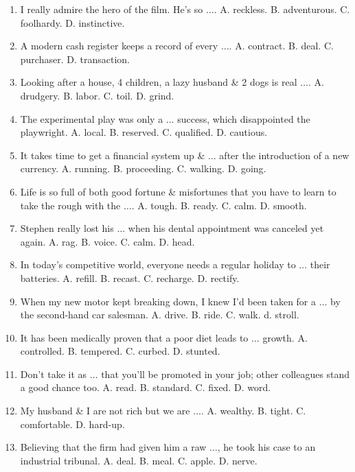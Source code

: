 \documentclass{article}
\numberwithin{equation}{section}
\begin{document}
\begin{enumerate}[leftmargin=8mm]
	\item I really admire the hero of the film. He's so $\ldots$. {\sf A.} reckless. {\sf B.} adventurous. {\sf C.} foolhardy. {\sf D.} instinctive.
	\item A modern cash register keeps a record of every $\ldots$. {\sf A.} contract. {\sf B.} deal. {\sf C.} purchaser. {\sf D.} transaction.
	\item Looking after a house, 4 children, a lazy husband \& 2 dogs is real $\ldots$. {\sf A.} drudgery. {\sf B.} labor. {\sf C.} toil. {\sf D.} grind.
	\item The experimental play was only a $\ldots$ success, which disappointed the playwright. {\sf A.} local. {\sf B.} reserved. {\sf C.} qualified. {\sf D.} cautious.
	\item It takes time to get a financial system up \& $\ldots$ after the introduction of a new currency. {\sf A.} running. {\sf B.} proceeding. {\sf C.} walking. {\sf D.} going.
	\item Life is so full of both good fortune \& misfortunes that you have to learn to take the rough with the $\ldots$. {\sf A.} tough. {\sf B.} ready. {\sf C.} calm. {\sf D.} smooth.
	\item Stephen really lost his $\ldots$ when his dental appointment was canceled yet again. {\sf A.} rag. {\sf B.} voice. {\sf C.} calm. {\sf D.} head.
	\item In today's competitive world, everyone needs a regular holiday to $\ldots$ their batteries. {\sf A.} refill. {\sf B.} recast. {\sf C.} recharge. {\sf D.} rectify.
	\item When my new motor kept breaking down, I knew I'd been taken for a $\ldots$ by the second-hand car salesman. {\sf A.} drive. {\sf B.} ride. {\sf C.} walk. d. stroll.
	\item It has been medically proven that a poor diet leads to $\ldots$ growth. {\sf A.} controlled. {\sf B.} tempered. {\sf C.} curbed. {\sf D.} stunted.
	\item Don't take it as $\ldots$ that you'll be promoted in your job; other colleagues stand a good chance too. {\sf A.} read. {\sf B.} standard. {\sf C.} fixed. {\sf D.} word.
	\item My husband \& I are not rich but we are $\ldots$. {\sf A.} wealthy. {\sf B.} tight. {\sf C.} comfortable. {\sf D.} hard-up.
	\item Believing that the firm had given him a raw $\ldots$, he took his case to an industrial tribunal. {\sf A.} deal. {\sf B.} meal. {\sf C.} apple. {\sf D.} nerve.

\end{enumerate}
\end{document}
